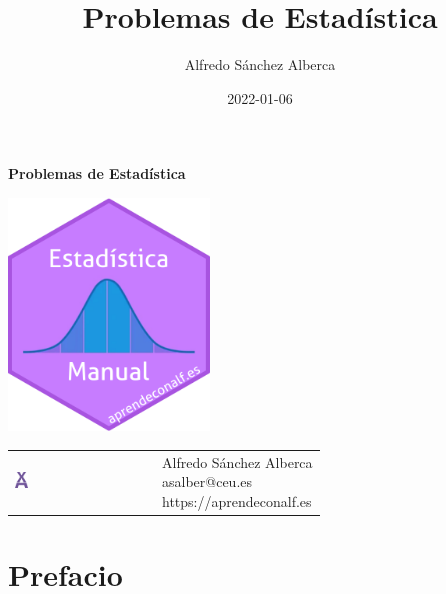 \documentclass[
  a4paper,
]{scrreport}
\title{Problemas de Estadística}
\author{Alfredo Sánchez Alberca}
\date{2022-01-06}
\renewcommand*\contentsname{Tabla de contenidos}
\newcommand\contentsname{Tabla de contenidos}
\theoremstyle{definition}
\theoremstyle{remark}
\begin{document}
\begin{titlepage}

\begin{center}
\vspace*{5cm}

\Huge
{\textbf{\textsf{Problemas de Estadística}}}

\vspace{0.5cm}
\LARGE
{\textbf{\textsf{}}}

\vspace{1.5cm}

\includegraphics[width=0.4\textwidth]{img/logos/sticker.png}
\end{center}

\vfill

\begin{flushleft}
\begin{tabular}{ll}
\includegraphics[width=0.1\textwidth]{img/logos/aprendeconalf.png} & \parbox[b]{5cm}{\Large\textsf{Alfredo
Sánchez
Alberca}\\ \textsf{asalber@ceu.es} \\ \textsf{https://aprendeconalf.es}}
\end{tabular}
\end{flushleft}
\end{titlepage}
\renewcommand*\contentsname{Tabla de contenidos}
{
\hypersetup{linkcolor=}
\setcounter{tocdepth}{2}
\tableofcontents
}


\chapter*{Prefacio}\label{prefacio}
\end{document}
